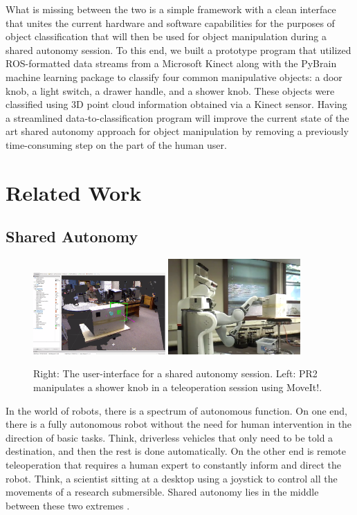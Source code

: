 \documentclass{article}
\begin{document}
What is missing between the two is a simple framework with a clean interface that unites the current hardware and software capabilities for the purposes of object classification that will then be used for object manipulation during a shared autonomy session. To this end, we built a prototype program that utilized ROS-formatted data streams from a Microsoft Kinect along with the PyBrain machine learning package to classify four common manipulative objects: a door knob, a light switch, a drawer handle, and a shower knob. These objects were classified using 3D point cloud information obtained via a Kinect sensor. Having a streamlined data-to-classification program will improve the current state of the art shared autonomy approach for object manipulation by removing a previously time-consuming step on the part of the human user.

\section{Related Work}
\subsection{Shared Autonomy}
\begin{figure}[h!]
    \centering
    \includegraphics[width=0.45\textwidth]{Shared_Autonomy_1.png}
    \includegraphics[width=0.45\textwidth]{Shared_Autonomy_2.png}
    \caption{Right: The user-interface for a shared autonomy session. Left: PR2 manipulates a shower knob in a teleoperation session using MoveIt!.}
    \label{fig:sharedAutonomy}
\end{figure}

In the world of robots, there is a spectrum of autonomous function.  On one end, there is a fully autonomous robot
without the need for human intervention in the direction of basic tasks.  Think, driverless vehicles that only need to be told a destination, and then the rest is done automatically.  On the other end is remote teleoperation that requires a human expert to constantly inform and direct the robot.  Think, a scientist sitting at a desktop using a joystick to control all the movements of a research submersible. Shared autonomy lies in the middle between these two extremes \cite{sharedAutonomy}. 
\end{document}
